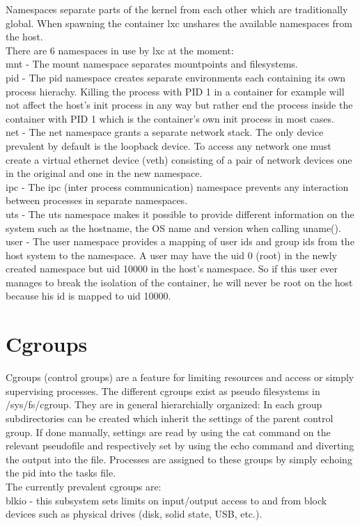 Namespaces separate parts of the kernel from each other which are traditionally global. When spawning the container lxc unshares
the available namespaces from the host.\\
There are 6 namespaces in use by lxc at the moment:\\
mnt - The mount namespace separates mountpoints and filesystems.\\
pid - The pid namespace creates separate environments each containing its own process hierachy. Killing the process with PID 1
in a container for example will not affect the host's init process in any way but rather end the process inside the container with PID 1
which is the container's own init process in most cases.\\
net - The net namespace grants a separate network stack. The only device prevalent by default is the loopback device. To access any network
one must create a virtual ethernet device (veth) consisting of a pair of network devices one in the original and one in the new namespace.\\
ipc - The ipc (inter process communication) namespace prevents any interaction between processes in separate namespaces.\\
uts - The uts namespace makes it possible to provide different information on the system such as the hostname, the OS name and version
when calling uname().\\
user - The user namespace provides a mapping of user ids and group ids from the host system to the namespace. A user may have the uid 0
(root) in the newly created namespace but uid 10000 in the host's namespace. So if this user ever manages to break the isolation of the
container, he will never be root on the host because his id is mapped to uid 10000.\\

\section{Cgroups}

Cgroups (control groups) are a feature for limiting resources and access or simply supervising processes. The different cgroups exist as
pseudo filesystems in /sys/fs/cgroup. They are in general hierarchially organized: In each group subdirectories can be created
which inherit the settings of the parent control group. If done manually, settings are read by using the cat command on the relevant
pseudofile and respectively set by using the echo command and diverting the output into the file. Processes are assigned to these groups
by simply echoing the pid into the tasks file.\\
The currently prevalent cgroups are:\\
blkio - this subsystem sets limits on input/output access to and from block devices such as physical drives (disk, solid state, USB, etc.). 

